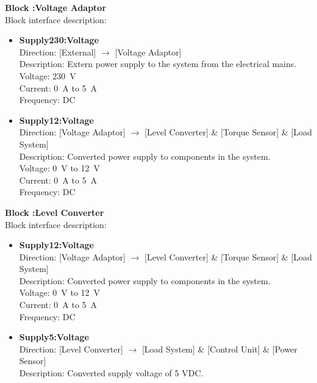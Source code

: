 \textbf{Block :Voltage Adaptor}\\
Block interface description:
\begin{itemize}
	\item \textbf{Supply230:Voltage}\\
	Direction: [External] $\rightarrow$ [Voltage Adaptor]\\
	Description: Extern power supply to the system from the electrical mains.\\
	Voltage: \SI{230}{\volt}\\
	Current: \SI{0}{\ampere} to \SI{5}{\ampere}\\
	Frequency: DC
	\item \textbf{Supply12:Voltage}\\
	Direction: [Voltage Adaptor] $\rightarrow$ [Level Converter] \& [Torque Sensor] \& [Load System]\\
	Description: Converted power supply to components in the system.\\
	Voltage: \SI{0}{\volt} to \SI{12}{\volt}\\
	Current: \SI{0}{\ampere} to \SI{5}{\ampere}\\
	Frequency: DC
\end{itemize}
		
\textbf{Block :Level Converter}\\
Block interface description:
\begin{itemize}
	\item \textbf{Supply12:Voltage}\\
	Direction: [Voltage Adaptor] $\rightarrow$ [Level Converter] \& [Torque Sensor] \& [Load System]\\
	Description: Converted power supply to components in the system.\\
	Voltage: \SI{0}{\volt} to \SI{12}{\volt}\\
	Current: \SI{0}{\ampere} to \SI{5}{\ampere}\\
	Frequency: DC
	\item \textbf{Supply5:Voltage}\\
	Direction: [Level Converter] $\rightarrow$ [Load System] \& [Control Unit] \& [Power Sensor]\\
	Description: Converted supply voltage of 5 VDC.
\end{itemize}
			
